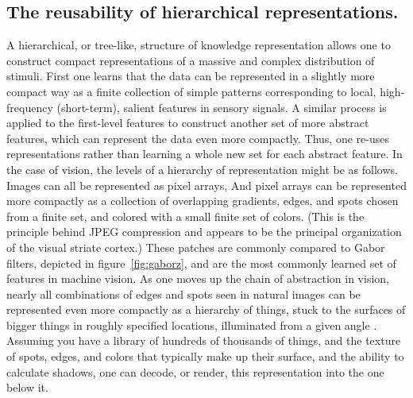 \documentclass[12pt]{article}
\begin{document}
\begin{doublespacing}
	\subsection{The reusability of hierarchical representations.}
	A hierarchical, or tree-like, structure of knowledge representation allows one to construct compact representations of a massive and complex distribution of stimuli. First one learns that the data can be represented in a slightly more compact way as a finite collection of simple patterns corresponding to local, high-frequency (short-term), salient features in sensory signals. A similar process is applied to the first-level features to construct another set of more abstract features, which can represent the data even more compactly. Thus, one re-uses representations rather than learning a whole new set for each abstract feature.
	In the case of vision, the levels of a hierarchy of representation might be as follows. Images can all be represented as pixel arrays, And pixel arrays can be represented more compactly as a collection of overlapping gradients, edges, and spots chosen from a finite set, and colored with a small finite set of colors. (This is the principle behind JPEG compression and appears to be the principal organization of the visual striate cortex.\cite{daugman1980two}) These patches are commonly compared to Gabor filters, depicted in figure~\ref{fig:gaborz}\cite{daugman1988complete, jain1991unsupervised}, and are the most commonly learned set of features in machine vision. As one moves up the chain of abstraction in vision, nearly all combinations of edges and spots seen in natural images can be represented even more compactly as a hierarchy of things, stuck to the surfaces of bigger things in roughly specified locations, illuminated from a given angle \cite{gluckman2003kurtosis}. Assuming you have a library of hundreds of thousands of things, and the texture of spots, edges, and colors that typically make up their surface, and the ability to calculate shadows, one can decode, or render, this representation into the one below it.


\end{doublespacing}
\end{document}
